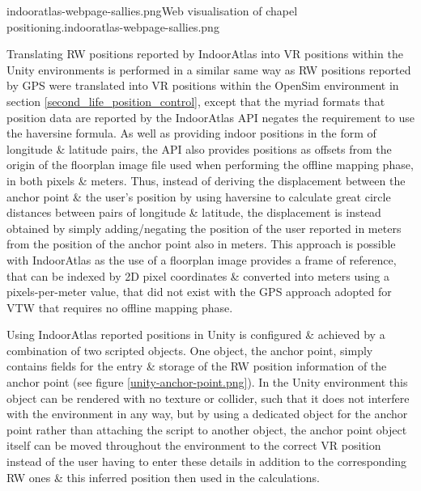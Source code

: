         {indooratlas-webpage-sallies.png}{Web visualisation of chapel positioning.}{indooratlas-webpage-sallies.png}

Translating RW positions reported by IndoorAtlas into VR positions within the Unity environments is performed in a similar same way as RW positions reported by GPS were translated into VR positions within the OpenSim environment in section \ref{second_life_position_control}, except that the myriad formats that position data are reported by the IndoorAtlas API negates the requirement to use the haversine formula. As well as providing indoor positions in the form of longitude \& latitude pairs, the API also provides positions as offsets from the origin of the floorplan image file used when performing the offline mapping phase, in both pixels \& meters. Thus, instead of deriving the displacement between the anchor point \& the user's position by using haversine to calculate great circle distances between pairs of longitude \& latitude, the displacement is instead obtained by simply adding/negating the position of the user reported in meters from the position of the anchor point also in meters. This approach is possible with IndoorAtlas as the use of a floorplan image provides a frame of reference, that can be indexed by 2D pixel coordinates \& converted into meters using a pixels-per-meter value, that did not exist with the GPS approach adopted for VTW that requires no offline mapping phase.

	
Using IndoorAtlas reported positions in Unity is configured \& achieved by a combination of two scripted objects. One object, the anchor point, simply contains fields for the entry \& storage of the RW position information of the anchor point (see figure \ref{unity-anchor-point.png}). In the Unity environment this object can be rendered with no texture or collider, such that it does not interfere with the environment in any way, but by using a dedicated object for the anchor point rather than attaching the script to another object, the anchor point object itself can be moved throughout the environment to the correct VR position instead of the user having to enter these details in addition to the corresponding RW ones \& this inferred position then used in the calculations.

